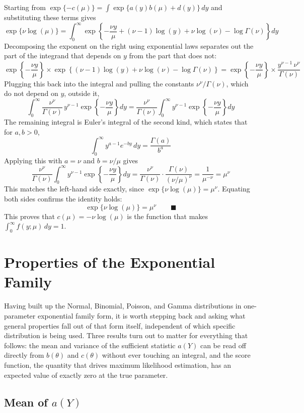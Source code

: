 \documentclass[12pt,a4paper]{report}
\begin{document}
Starting from $\exp\{-c(\mu)\} = \int \exp\{a(y)b(\mu) + d(y)\}\,dy$ and substituting these terms gives
\[
\exp\{\nu\log(\mu)\} = \int_0^{\infty} \exp\left\{-\frac{\nu y}{\mu} + (\nu-1)\log(y) + \nu\log(\nu) - \log\Gamma(\nu)\right\} dy
\]
Decomposing the exponent on the right using exponential laws separates out the part of the integrand that depends on $y$ from the part that does not:
\[
\exp\left\{-\frac{\nu y}{\mu}\right\} \times \exp\left\{(\nu-1)\log(y) + \nu\log(\nu) - \log\Gamma(\nu)\right\}
= \exp\left\{-\frac{\nu y}{\mu}\right\} \times \frac{y^{\nu-1}\,\nu^{\nu}}{\Gamma(\nu)}
\]
Plugging this back into the integral and pulling the constants $\nu^\nu/\Gamma(\nu)$, which do not depend on $y$, outside it,
\[
\int_0^{\infty} \frac{\nu^{\nu}}{\Gamma(\nu)}\, y^{\nu-1}\exp\left\{-\frac{\nu y}{\mu}\right\} dy
= \frac{\nu^{\nu}}{\Gamma(\nu)} \int_0^{\infty} y^{\nu-1}\exp\left\{-\frac{\nu y}{\mu}\right\} dy
\]
The remaining integral is Euler's integral of the second kind, which states that for $a,b > 0$,
\[
\int_0^{\infty} y^{a-1}e^{-by}\,dy = \frac{\Gamma(a)}{b^{a}}
\]
Applying this with $a = \nu$ and $b = \nu/\mu$ gives
\[
\frac{\nu^{\nu}}{\Gamma(\nu)} \int_0^{\infty} y^{\nu-1}\exp\left\{-\frac{\nu y}{\mu}\right\} dy = \frac{\nu^{\nu}}{\Gamma(\nu)}\cdot\frac{\Gamma(\nu)}{(\nu/\mu)^{\nu}} = \frac{1}{\mu^{-\nu}} = \mu^{\nu}
\]
This matches the left-hand side exactly, since $\exp\{\nu\log(\mu)\} = \mu^{\nu}$. Equating both sides confirms the identity holds:
\[
\exp\{\nu\log(\mu)\} = \mu^{\nu} \qquad \blacksquare
\]
This proves that $c(\mu) = -\nu\log(\mu)$ is the function that makes $\int_0^{\infty} f(y;\mu)\,dy = 1$.

\chapter{Properties of the Exponential Family}

Having built up the Normal, Binomial, Poisson, and Gamma distributions in one-parameter exponential family form, it is worth stepping back and asking what general properties fall out of that form itself, independent of which specific distribution is being used. Three results turn out to matter for everything that follows: the mean and variance of the sufficient statistic $a(Y)$ can be read off directly from $b(\theta)$ and $c(\theta)$ without ever touching an integral, and the score function, the quantity that drives maximum likelihood estimation, has an expected value of exactly zero at the true parameter.

\section{Mean of $a(Y)$}
\end{document}
